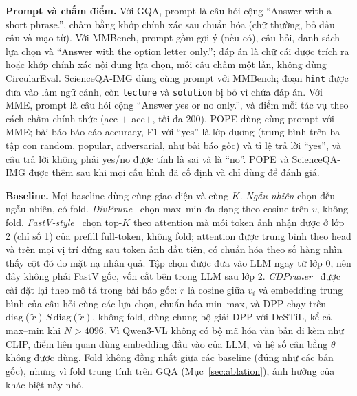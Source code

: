\documentclass[conference]{IEEEtran}
\begin{document}
\textbf{Prompt và chấm điểm.} Với GQA, prompt là câu hỏi cộng ``Answer with a short phrase.'', chấm bằng khớp chính xác sau chuẩn hóa (chữ thường, bỏ dấu câu và mạo từ). Với MMBench, prompt gồm gợi ý (nếu có), câu hỏi, danh sách lựa chọn và ``Answer with the option letter only.''; đáp án là chữ cái được trích ra hoặc khớp chính xác nội dung lựa chọn, mỗi câu chấm một lần, không dùng CircularEval. ScienceQA-IMG dùng cùng prompt với MMBench; đoạn \texttt{hint} được đưa vào làm ngữ cảnh, còn \texttt{lecture} và \texttt{solution} bị bỏ vì chứa đáp án. Với MME, prompt là câu hỏi cộng ``Answer yes or no only.'', và điểm mỗi tác vụ theo cách chấm chính thức (acc $+$ acc$+$, tối đa 200). POPE dùng cùng prompt với MME; bài báo báo cáo accuracy, F1 với ``yes'' là lớp dương (trung bình trên ba tập con random, popular, adversarial, như bài báo gốc) và tỉ lệ trả lời ``yes'', và câu trả lời không phải yes/no được tính là sai và là ``no''. POPE và ScienceQA-IMG được thêm sau khi mọi cấu hình đã cố định và chỉ dùng để đánh giá.

\textbf{Baseline.} Mọi baseline dùng cùng giao diện và cùng $K$. \emph{Ngẫu nhiên} chọn đều ngẫu nhiên, có fold. \emph{DivPrune}~\cite{alvar2025divprune} chọn max--min đa dạng theo cosine trên $v$, không fold. \emph{FastV-style}~\cite{chen2024fastv} chọn top-$K$ theo attention mà mỗi token ảnh nhận được ở lớp 2 (chỉ số 1) của prefill full-token, không fold; attention được trung bình theo head và trên mọi vị trí đứng sau token ảnh đầu tiên, có chuẩn hóa theo số hàng nhìn thấy cột đó do mặt nạ nhân quả. Tập chọn được đưa vào LLM ngay từ lớp 0, nên đây không phải FastV gốc, vốn cắt bên trong LLM sau lớp 2. \emph{CDPruner}~\cite{zhang2025cdpruner} được cài đặt lại theo mô tả trong bài báo gốc: $\tilde r$ là cosine giữa $v_i$ và embedding trung bình của câu hỏi cùng các lựa chọn, chuẩn hóa min--max, và DPP chạy trên $\mathrm{diag}(\tilde r)\,S\,\mathrm{diag}(\tilde r)$, không fold, dùng chung bộ giải DPP với DeSTiL, kể cả max--min khi $N>4096$. Vì Qwen3-VL không có bộ mã hóa văn bản đi kèm như CLIP, điểm liên quan dùng embedding đầu vào của LLM, và hệ số cân bằng $\theta$ không được dùng. Fold không đồng nhất giữa các baseline (đúng như các bản gốc), nhưng vì fold trung tính trên GQA (Mục~\ref{sec:ablation}), ảnh hưởng của khác biệt này nhỏ.
\end{document}

